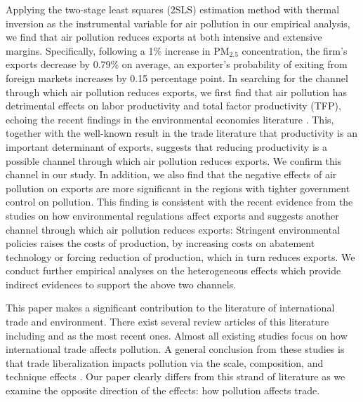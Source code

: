 \documentclass[12pt]{article}
\begin{document}
Applying the two-stage least squares (2SLS) estimation method with thermal inversion as the instrumental variable for air pollution in our empirical analysis, 
we find that air
pollution reduces exports at both intensive and extensive margins.
Specifically, following a 1\% increase in $\mathrm{PM_{2.5}}$ concentration,
the firm's exports decrease by 0.79\% on average, an exporter's probability of exiting from foreign markets increases by
0.15 percentage point. In searching for the channel through which air
pollution reduces exports, we first find that air pollution has detrimental
effects on labor productivity and total factor productivity (TFP), echoing
the recent findings in the environmental economics literature %
\citep{NBERw18392,fu2021air,NBERw28401}. This, together with the well-known result in the
trade literature that productivity is an important determinant of exports,
suggests that reducing productivity is a possible channel through which air
pollution reduces exports. We confirm this channel in our study. In
addition, we also find that the negative effects of air pollution on exports
are more significant in the regions with tighter government control on
pollution. This finding is consistent with the recent evidence from the
studies on how environmental regulations affect exports \citep[e.g.,][]{
cherniwchan2022environmental} and suggests another channel through which air
pollution reduces exports: Stringent environmental policies raises the costs
of production, by increasing costs on abatement technology or forcing
reduction of production, which in turn reduces exports. We conduct further
empirical analyses on the heterogeneous effects which provide indirect
evidences to support the above two channels.

This paper makes a significant contribution to the literature of
international trade and environment. There exist several review articles of
this literature including \cite{cherniwchan2017trade} and \cite{NBERw30020}
as the most recent ones. Almost all existing studies focus on how
international trade affects pollution. A general conclusion from these
studies is that trade liberalization impacts pollution via the scale,
composition, and technique effects \citep{NBERw3914,copeland1994north}. Our
paper clearly differs from this strand of literature as we examine the
opposite direction of the effects: how pollution affects trade.
\end{document}
